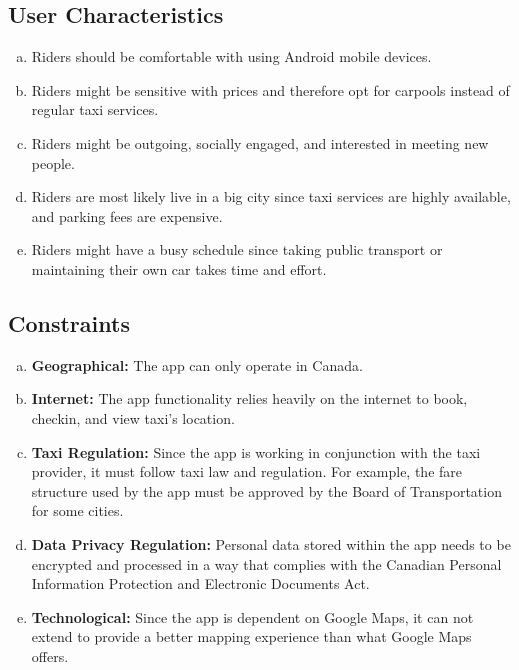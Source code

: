\documentclass[]{article}
\begin{document}

\subsection{User Characteristics}
\label{sub:user_characteristics}

\begin{enumerate}[a)]
	\item Riders should be comfortable with using Android mobile devices.
	\item Riders might be sensitive with prices and therefore opt for carpools instead of regular taxi services.
	\item Riders might be outgoing, socially engaged, and interested in meeting new people.
	\item Riders are most likely live in a big city since taxi services are highly available, and parking fees are expensive.
	\item Riders might have a busy schedule since taking public transport or maintaining their own car takes time and effort.



\end{enumerate}


\subsection{Constraints}
\label{sub:constraints}
\begin{enumerate}[a)]
	\item \textbf{Geographical:} The app can only operate in Canada.
	\item \textbf{Internet:} The app functionality relies heavily on the internet to book, checkin, and view taxi’s location.
	\item \textbf{Taxi Regulation:} Since the app is working in conjunction with the taxi provider, it must follow taxi law and regulation. For example, the fare structure used by the app must be approved by the Board of Transportation for some cities.
	\item \textbf{Data Privacy Regulation:} Personal data stored within the app needs to be encrypted and processed in a way that complies with the Canadian Personal Information Protection and Electronic Documents Act.
	\item \textbf{Technological:} Since the app is dependent on Google Maps, it can not extend to provide a better mapping experience than what Google Maps offers. 

\end{enumerate}
\end{document}
